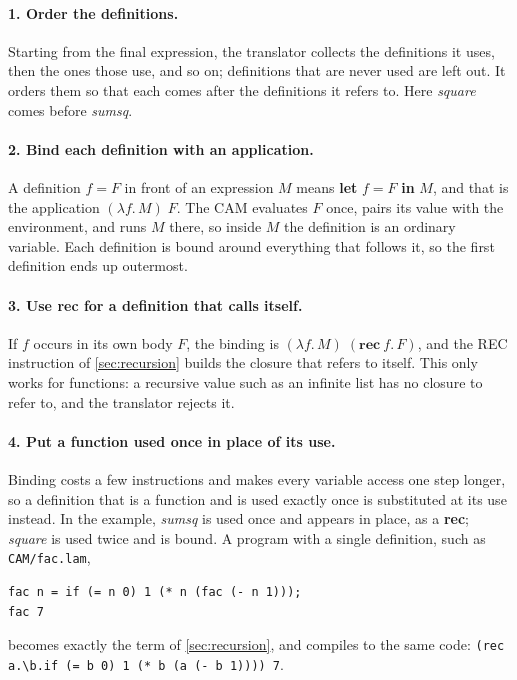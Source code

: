 \documentclass[11pt,a4paper]{article}
\newcommand{\ins}[1]{\textsf{#1}}
\theoremstyle{definition}
\theoremstyle{plain}
\begin{document}
\paragraph{1. Order the definitions.} Starting from the final expression,
the translator collects the definitions it uses, then the ones those use,
and so on; definitions that are never used are left out. It orders them so
that each comes after the definitions it refers to. Here \textit{square}
comes before \textit{sumsq}.

\paragraph{2. Bind each definition with an application.} A definition
$f = F$ in front of an expression $M$ means \textbf{let} $f = F$ \textbf{in}
$M$, and that is the application $(\lambda f.\,M)\;F$. The CAM evaluates
$F$ once, pairs its value with the environment, and runs $M$ there, so
inside $M$ the definition is an ordinary variable. Each definition is bound
around everything that follows it, so the first definition ends up
outermost.

\paragraph{3. Use \textbf{rec} for a definition that calls itself.} If $f$
occurs in its own body $F$, the binding is $(\lambda f.\,M)\;(\textbf{rec}\
f.\,F)$, and the \ins{REC} instruction of \cref{sec:recursion} builds the
closure that refers to itself. This only works for functions: a recursive
value such as an infinite list has no closure to refer to, and the
translator rejects it.

\paragraph{4. Put a function used once in place of its use.} Binding costs
a few instructions and makes every variable access one step longer, so a
definition that is a function and is used exactly once is substituted at
its use instead. In the example, \textit{sumsq} is used once and appears in
place, as a \textbf{rec}; \textit{square} is used twice and is bound. A
program with a single definition, such as \texttt{CAM/fac.lam},
\begin{lstlisting}[style=cam]
fac n = if (= n 0) 1 (* n (fac (- n 1)));
fac 7
\end{lstlisting}
becomes exactly the term of \cref{sec:recursion}, and compiles to the same
code: \texttt{(rec a.\textbackslash b.if (= b 0) 1 (* b (a (- b 1)))) 7}.
\end{document}
